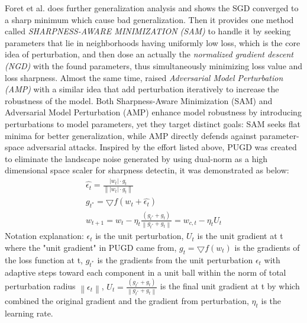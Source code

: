 \documentclass[10pt,twocolumn,letterpaper]{article}
\begin{document}
Foret et al.\cite{foret2021sharpnessawareminimizationefficientlyimproving} does further generalization analysis and shows the SGD converged to a sharp minimum which cause bad generalization. Then it provides one method called \textit{SHARPNESS-AWARE MINIMIZATION (SAM)} to handle it by seeking parameters that lie in neighborhoods having uniformly low loss, which is the core idea of perturbation, and then dose an actually the \textit{normalized gradient descent (NGD)} \cite{murray2018revisitingnormalizedgradientdescent} with the found parameters, thus simultaneously minimizing loss value and loss sharpness. Almost the same time, \cite{zheng2021regularizingneuralnetworksadversarial} raised \textit{Adversarial Model Perturbation (AMP)} with a similar idea that add perturbation iteratively to increase the robustness of the model. Both Sharpness-Aware Minimization (SAM) and Adversarial Model Perturbation (AMP) enhance model robustness by introducing perturbations to model parameters, yet they target distinct goals: SAM seeks flat minima for better generalization, while AMP directly defends against parameter-space adversarial attacks.
Inspired by the effort listed above, PUGD \cite{Tseng_2022} was created to eliminate the landscape noise generated by using dual-norm as a high dimensional space scaler for sharpness detectin, it was demonstrated as below:
\begin{gather}
	\hat{\epsilon_{t}} = \frac{\left | w_t \right | \cdot g_t}{\left \| \left | w_t \right | \cdot g_t \right \| } \label{eq:1} \\
	g_{t^{*}} = \bigtriangledown f (w_t + \hat{\epsilon_{t} }) \label{eq:2} \\
	w_{t+1} = w_{t} - \eta _t \frac{(g_{t^{*}} + g_t)}{\left \|g_{t^{*}} + g_t\right \| } = w_{c,t} - \eta _t U_t \label{eq:3} 
\end{gather}
Notation explanation: $\epsilon_{t}$ is the unit perturbation, $U_t$ is the unit gradient at t where the "unit gradient" in PUGD came from,  $g_t = \bigtriangledown f (w_t)$ is the gradients of the loss function at t, $g_{t^{*}}$ is the gradients from the unit perturbation $\epsilon_{t}$ with adaptive steps toward each component in a unit ball within the norm of total perturbation radius $\left \| \epsilon_{t} \right \|$, $U_t = \frac{(g_{t^{*}} + g_t)}{\left \|g_{t^{*}} + g_t\right \| }$ is the final unit gradient at t by which combined the original gradient and the gradient from perturbation, $\eta_t$ is the learning rate.

\end{document}
